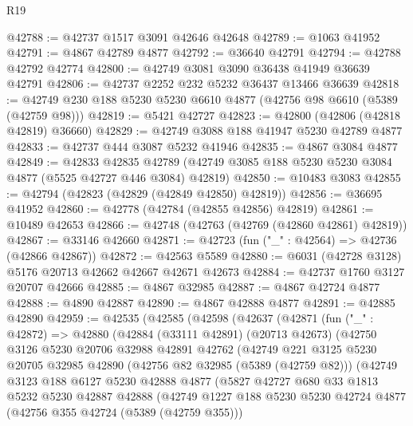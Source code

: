 \begin{lexlean}{R19}
\begin{coremodule}
@42788 := @42737 @1517 @3091 @42646 @42648
@42789 := @1063 @41952
@42791 := @4867 @42789 @4877
@42792 := @36640 @42791
@42794 := @42788 @42792 @42774
@42800 := @42749 @3081 @3090 @36438 @41949 @36639 @42791
@42806 := @42737 @2252 @232 @5232 @36437 @13466 @36639
@42818 := @42749 @230 @188 @5230 @5230 @6610 @4877 (@42756 @98 @6610 (@5389 (@42759 @98)))
@42819 := @5421 @42727
@42823 := @42800 (@42806 (@42818 @42819) @36660)
@42829 := @42749 @3088 @188 @41947 @5230 @42789 @4877
@42833 := @42737 @444 @3087 @5232 @41946
@42835 := @4867 @3084 @4877
@42849 := @42833
    @42835
    @42789
    (@42749 @3085 @188 @5230 @5230 @3084 @4877 (@5525 @42727 @446 @3084) @42819)
@42850 := @10483 @3083
@42855 := @42794 (@42823 (@42829 (@42849 @42850) @42819))
@42856 := @36695 @41952
@42860 := @42778 (@42784 (@42855 @42856) @42819)
@42861 := @10489 @42653
@42866 := @42748 (@42763 (@42769 (@42860 @42861) @42819))
@42867 := @33146 @42660
@42871 := @42723 (fun ("_" : @42564) => @42736 (@42866 @42867))
@42872 := @42563 @5589
@42880 := @6031 (@42728 @3128) @5176 @20713 @42662 @42667 @42671 @42673
@42884 := @42737 @1760 @3127 @20707 @42666
@42885 := @4867 @32985
@42887 := @4867 @42724 @4877
@42888 := @4890 @42887
@42890 := @4867 @42888 @4877
@42891 := @42885 @42890
@42959 := @42535
    (@42585
      (@42598
        (@42637
          (@42871
            (fun ("_" : @42872) =>
            @42880
              (@42884
                (@33111 @42891)
                (@20713 @42673)
                (@42750
                  @3126
                  @5230
                  @20706
                  @32988
                  @42891
                  @42762
                  (@42749
                    @221
                    @3125
                    @5230
                    @20705
                    @32985
                    @42890
                    (@42756 @82 @32985 (@5389 (@42759 @82)))
                    (@42749
                      @3123
                      @188
                      @6127
                      @5230
                      @42888
                      @4877
                      (@5827
                        @42727
                        @680
                        @33
                        @1813
                        @5232
                        @5230
                        @42887
                        @42888
                        (@42749
                          @1227
                          @188
                          @5230
                          @5230
                          @42724
                          @4877
                          (@42756 @355 @42724 (@5389 (@42759 @355)))

\end{coremodule}
\end{lexlean}
